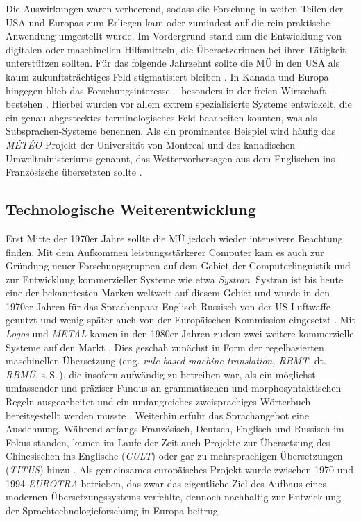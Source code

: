 Die Auswirkungen waren verheerend, sodass die Forschung in weiten Teilen der USA und Europas zum Erliegen kam oder zumindest auf die rein praktische Anwendung umgestellt wurde. Im Vordergrund stand nun die Entwicklung von digitalen oder maschinellen Hilfsmitteln, die Übersetzer{\textperiodcentered}innen bei ihrer Tätigkeit unterstützen sollten. Für das folgende Jahrzehnt sollte die MÜ in den USA als kaum zukunftsträchtiges Feld stigmatisiert bleiben \citep[6]{stein_machine_2013}. In Kanada und Europa hingegen blieb das Forschungsinteresse -- besonders in der freien Wirtschaft -- bestehen \citep[439]{hutchins_machine_1995}. Hierbei wurden vor allem extrem spezialisierte Systeme entwickelt, die ein genau abgestecktes terminologisches Feld bearbeiten konnten, was \citet[33]{krenz_maschinelle_2008} als \glqq Subsprachen-Systeme\grqq{} benennen. Als ein prominentes Beispiel wird häufig das \emph{MÉTÉO}-Projekt  der Universität von Montreal und des kanadischen Umweltministeriums genannt, das Wettervorhersagen aus dem Englischen ins Französische übersetzten sollte \citep[38]{bowker_machine_2019}.

\subsection{Technologische Weiterentwicklung}
\label{K3:para:technologische-weiterentwicklung}

Erst Mitte der 1970er Jahre sollte die MÜ jedoch wieder intensivere Beachtung finden. Mit dem Aufkommen leistungsstärkerer Computer kam es auch zur Gründung neuer Forschungsgruppen auf dem Gebiet der Computerlinguistik und zur Entwicklung kommerzieller Systeme wie etwa \emph{Systran}. Systran ist bis heute eine der bekanntesten Marken weltweit auf diesem Gebiet und wurde in den 1970er Jahren für das Sprachenpaar Englisch-Russisch von der US-Luftwaffe genutzt und wenig später auch von der Europäischen Kommission eingesetzt \citep[139--142]{hutchins_machine_1995}. Mit \emph{Logos} und \emph{METAL} kamen in den 1980er Jahren zudem zwei weitere kommerzielle Systeme auf den Markt \citep[35]{koehn_neural_2020}. Dies geschah zunächst in Form der regelbasierten maschinellen Übersetzung (eng. \emph{rule-based machine translation, RBMT}, dt. \emph{RBMÜ}, s.\,S.\,\pageref{K3:subsec:RBMT}), die insofern aufwändig zu betreiben war, als ein möglichst umfassender und präziser Fundus an grammatischen und morphosyntaktischen Regeln ausgearbeitet und ein umfangreiches zweisprachiges Wörterbuch bereitgestellt werden musste \citep[7]{stein_machine_2013}. Weiterhin erfuhr das Sprachangebot eine Ausdehnung. Während anfangs Französisch, Deutsch, Englisch und Russisch im Fokus standen, kamen im Laufe der Zeit auch Projekte zur Übersetzung des Chinesischen ins Englische (\emph{CULT}) oder gar zu mehrsprachigen Übersetzungen (\emph{TITUS}) hinzu \citep[34]{krenz_maschinelle_2008}. Als gemeinsames europäisches Projekt wurde zwischen 1970 und 1994 \emph{EUROTRA} betrieben, das zwar das eigentliche Ziel \glqq des Aufbaus eines modernen Übersetzungssystems\grqq{} \citep[30]{burchardt_deutsche_2012} verfehlte, dennoch nachhaltig zur Entwicklung der Sprachtechnologieforschung in Europa beitrug.

